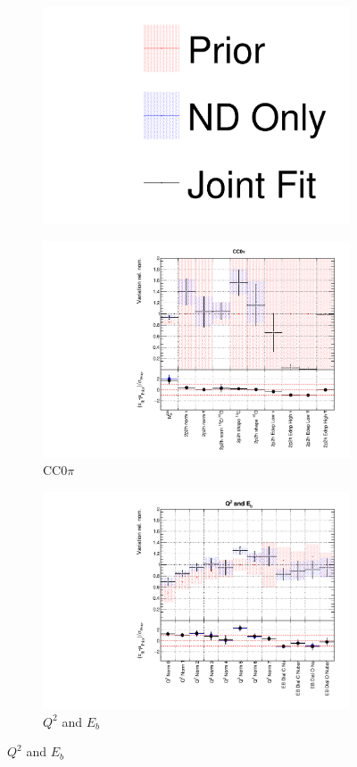 \begin{figure}[!htbp]
\centering
\begin{subfigure}{0.95\textwidth}
  \centering
  \includegraphics[width=0.25\linewidth]{figs/joint_leg}
\end{subfigure}
\begin{subfigure}{0.49\textwidth}
  \centering
  \includegraphics[width=0.9\linewidth]{figs/jointxsec1}
  \caption{CC0$\pi$}
\end{subfigure}
\begin{subfigure}{0.49\textwidth}
  \centering
  \includegraphics[width=0.9\linewidth]{figs/jointxsec2}
  \caption{$Q^2$ and $E_b$}
\end{subfigure}

\end{figure}
